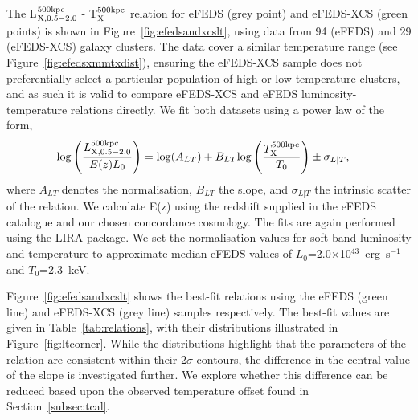 \documentclass[fleqn,usenatbib]{mnras}
\begin{document}
The L$^{500\rm{kpc}}_{\rm{X,0.5-2.0}}$ - T$_{\rm{X}}^{500\rm{kpc}}$ relation for eFEDS (grey point) and eFEDS-XCS (green points) is shown in Figure~\ref{fig:efedsandxcslt}, using data from 94 (eFEDS) and 29 (eFEDS-XCS) galaxy clusters.  The data cover a similar temperature range (see Figure~\ref{fig:efedsxmmtxdist}), ensuring the eFEDS-XCS sample does not preferentially select a particular population of high or low temperature clusters, and as such it is valid to compare eFEDS-XCS and eFEDS luminosity-temperature relations directly.  We fit both datasets using a power law of the form, 
\begin{align}
{\rm log}\left(\frac{L^{500\rm{kpc}}_{\rm{X,0.5-2.0}}}{E(z)L_{0}}\right) &= {\rm log}(A_{LT}) + B_{LT}{\rm log}\left(\frac{T^{\rm{500kpc}}_{\rm{X}}}{T_{0}}\right) \pm \sigma_{L|T},
\label{equ:lt}
\end{align}
where $A_{LT}$ denotes the normalisation, $B_{LT}$ the slope, and $\sigma_{L|T}$ the intrinsic scatter of the relation. We calculate E(z) using the redshift supplied in the eFEDS catalogue and our chosen concordance cosmology.  The fits are again performed using the LIRA package. We set the normalisation values for soft-band luminosity and temperature to approximate median eFEDS values of $L_{0}$=2.0$\times$10$^{43}$~erg~s$^{-1}$ and $T_{0}$=2.3~keV.

Figure~\ref{fig:efedsandxcslt} shows the best-fit relations  using the eFEDS (green line) and eFEDS-XCS (grey line) samples respectively.  The best-fit values are given in Table~\ref{tab:relations}, with their distributions illustrated in Figure~\ref{fig:ltcorner}.  While the distributions highlight that the parameters of the relation are consistent within their 2$\sigma$ contours, the difference in the central value of the slope is investigated further.  We explore whether this difference can be reduced based upon the observed temperature offset found in Section~\ref{subsec:tcal}.
\end{document}

